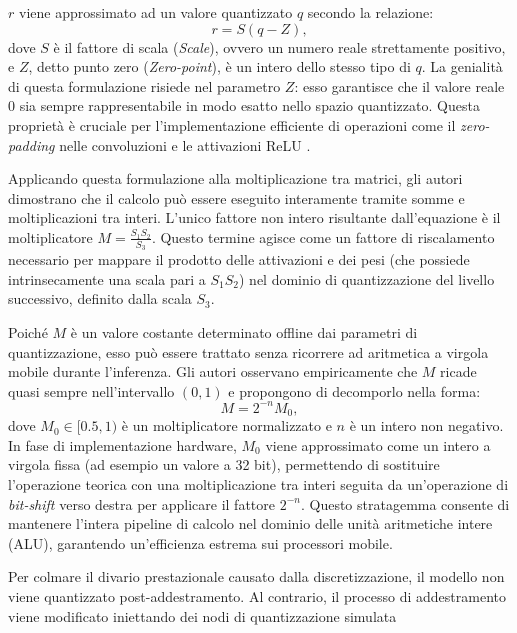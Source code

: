 $r$ viene approssimato ad un valore quantizzato $q$ secondo la relazione:
\begin{equation}
    r = S(q - Z),
\end{equation}
dove $S$ è il fattore di scala (\textit{Scale}), ovvero un numero reale strettamente positivo, e $Z$, detto punto zero (\textit{Zero-point}), è un intero dello stesso tipo di $q$. La genialità di questa formulazione risiede nel parametro $Z$: esso garantisce che il valore reale $0$ sia sempre rappresentabile in modo esatto nello spazio quantizzato. Questa proprietà è cruciale per l'implementazione efficiente di operazioni come il \textit{zero-padding} nelle convoluzioni e le attivazioni ReLU \cite{agarap2019deeplearningusingrectified}. \par
Applicando questa formulazione alla moltiplicazione tra matrici, gli autori
dimostrano che il calcolo può essere eseguito interamente tramite somme e
moltiplicazioni tra interi. L'unico fattore non intero risultante
dall'equazione è il moltiplicatore $M = \frac{S_1 S_2}{S_3}$. Questo termine
agisce come un fattore di riscalamento necessario per mappare il prodotto delle
attivazioni e dei pesi (che possiede intrinsecamente una scala pari a $S_1
    S_2$) nel dominio di quantizzazione del livello successivo, definito dalla
scala $S_3$. \par
Poiché $M$ è un valore costante determinato offline dai parametri di
quantizzazione, esso può essere trattato senza ricorrere ad aritmetica a
virgola mobile durante l'inferenza. Gli autori osservano empiricamente che $M$
ricade quasi sempre nell'intervallo $(0, 1)$ e propongono di decomporlo nella
forma:
\begin{equation}
    M = 2^{-n} M_0,
\end{equation}
dove $M_0 \in [0.5, 1)$ è un moltiplicatore normalizzato e $n$ è un intero non negativo. In fase di implementazione hardware, $M_0$ viene approssimato come un intero a virgola fissa (ad esempio un valore a 32 bit), permettendo di sostituire l'operazione teorica con una moltiplicazione tra interi seguita da un'operazione di \textit{bit-shift} verso destra per applicare il fattore $2^{-n}$. Questo stratagemma consente di mantenere l'intera pipeline di calcolo nel dominio delle unità aritmetiche intere (ALU), garantendo un'efficienza estrema sui processori mobile. \par
Per colmare il divario prestazionale causato dalla discretizzazione, il modello
non viene quantizzato post-addestramento. Al contrario, il processo di
addestramento viene modificato iniettando dei nodi di quantizzazione simulata
